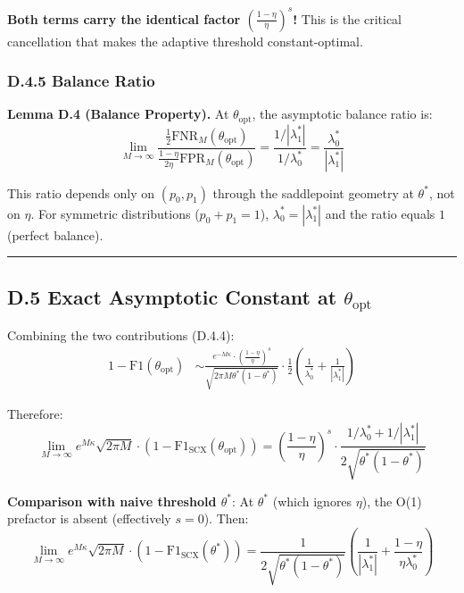 \documentclass[
  12pt,
]{ctexart}
\begin{document}
\textbf{Both terms carry the identical factor
\(\left(\frac{1-\eta}{\eta}\right)^{s}\)!} This is the critical
cancellation that makes the adaptive threshold constant-optimal.

\subsubsection{D.4.5 Balance Ratio}\label{d.4.5-balance-ratio}

\textbf{Lemma D.4 (Balance Property).} At \(\theta_{\text{opt}}\), the
asymptotic balance ratio is:
\[\lim_{M\to\infty} \frac{\frac{1}{2}\text{FNR}_M(\theta_{\text{opt}})}{\frac{1-\eta}{2\eta}\text{FPR}_M(\theta_{\text{opt}})} = \frac{1/|\lambda_1^*|}{1/\lambda_0^*} = \frac{\lambda_0^*}{|\lambda_1^*|}\]

This ratio depends only on \((p_0, p_1)\) through the saddlepoint
geometry at \(\theta^*\), not on \(\eta\). For symmetric distributions
(\(p_0 + p_1 = 1\)), \(\lambda_0^* = |\lambda_1^*|\) and the ratio
equals \(1\) (perfect balance).

\begin{center}\rule{0.5\linewidth}{0.5pt}\end{center}

\subsection{\texorpdfstring{D.5 Exact Asymptotic Constant at
\(\theta_{\text{opt}}\)}{D.5 Exact Asymptotic Constant at \textbackslash theta\_\{\textbackslash text\{opt\}\}}}\label{d.5-exact-asymptotic-constant-at-theta_textopt}

Combining the two contributions (D.4.4): \[\begin{aligned}
1 - \text{F1}(\theta_{\text{opt}}) &\sim \frac{e^{-M\kappa} \cdot \left(\frac{1-\eta}{\eta}\right)^{s}}{\sqrt{2\pi M \theta^*(1-\theta^*)}} \cdot \frac{1}{2}\left(\frac{1}{\lambda_0^*} + \frac{1}{|\lambda_1^*|}\right)
\end{aligned}\]

Therefore:
\[\boxed{\lim_{M\to\infty} e^{M\kappa} \sqrt{2\pi M} \cdot (1 - \text{F1}_{\text{SCX}}(\theta_{\text{opt}})) = \left(\frac{1-\eta}{\eta}\right)^{s} \cdot \frac{1/\lambda_0^* + 1/|\lambda_1^*|}{2\sqrt{\theta^*(1-\theta^*)}}}\]

\textbf{Comparison with naive threshold \(\theta^*\)}: At \(\theta^*\)
(which ignores \(\eta\)), the O(1) prefactor is absent (effectively
\(s=0\)). Then:
\[\lim_{M\to\infty} e^{M\kappa} \sqrt{2\pi M} \cdot (1 - \text{F1}_{\text{SCX}}(\theta^*)) = \frac{1}{2\sqrt{\theta^*(1-\theta^*)}}\left(\frac{1}{|\lambda_1^*|} + \frac{1-\eta}{\eta\lambda_0^*}\right)\]
\end{document}
